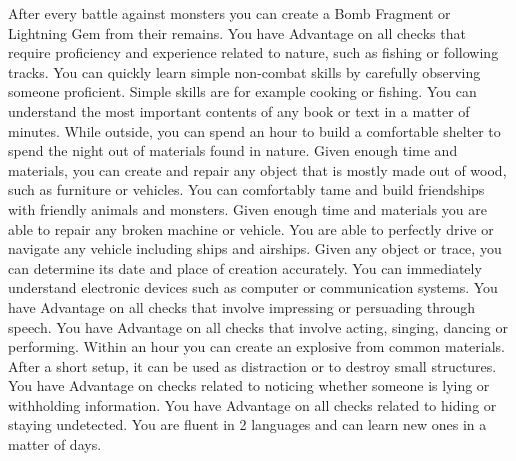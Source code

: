 %
{
	After every battle against monsters you can create a Bomb Fragment or Lightning Gem from their remains. 
}
\vfill
{}
{
	You have Advantage on all checks that require proficiency and experience related to nature, such as fishing or following tracks. 
}
\vfill
{}
{
	You can quickly learn simple non-combat skills by carefully observing someone proficient. 
	Simple skills are for example cooking or fishing.
}
\vfill
{}
{
	You can understand the most important contents of any book or text in a matter of minutes.
}
\vfill
{}
{
	While outside, you can spend an hour to build a comfortable shelter to spend the night out of materials found in nature.
}	
\vfill
{}
{
	Given enough time and materials, you can create and repair any object that is mostly made out of wood, such as furniture or vehicles.
}
\vfill
{}
{
	You can comfortably tame and build friendships with friendly animals and monsters.
}
\vfill
{}
{
	Given enough time and materials you are able to repair any broken machine or vehicle. 
}
\vfill
{}
{
	You are able to perfectly drive or navigate any vehicle including ships and airships. 
}
\vfill
{} 
{
	Given any object or trace, you can determine its date and place of creation accurately.
}
\vfill
%
{
	You can immediately understand electronic devices such as computer or communication systems.
}
\vfill
{}
{
	You have Advantage on all checks that involve impressing or persuading through speech. 
}
\newpage
{}
{
	You have Advantage on all checks that involve acting, singing, dancing or performing.
}
\vfill
{} {
	Within an hour you can create an explosive from common materials.
	After a short setup, it can be used as distraction or to destroy small structures.
}
\vfill
{}
{
	You have Advantage on checks related to noticing whether someone is lying or withholding information.
}
\vfill
{} 
{
	You have Advantage on all checks related to hiding or staying undetected.
}
\vfill
{}
{
	You are fluent in 2 languages and can learn new ones in a matter of days.
}
\vfill
{}
